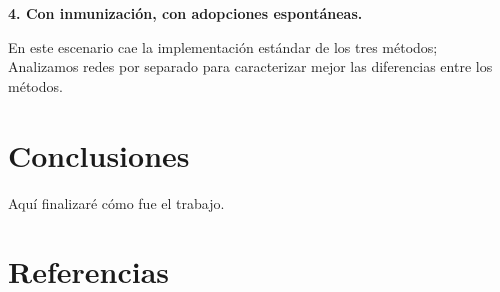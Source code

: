 \documentclass{article}
\begin{document}
\textbf{4. Con inmunización, con adopciones espontáneas.}

En este escenario cae la implementación estándar de los tres métodos; Analizamos redes por separado para caracterizar mejor las diferencias entre los métodos.\\

\section{Conclusiones}
	Aquí finalizaré cómo fue el trabajo.
	
\section{Referencias}

\printbibliography
\end{document}
